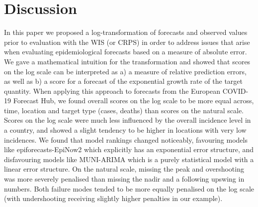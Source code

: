 \documentclass{article}
\begin{document}
\section{Discussion}
\label{sec:discussion}

In this paper we proposed a log-transformation of forecasts and observed values prior to evaluation with the WIS (or CRPS) in order to address issues that arise when evaluating epidemiological forecasts based on a measure of absolute error. We gave a mathematical intuition for the transformation and showed that scores on the log scale can be interpreted as a) a measure of relative prediction errors, as well as b) a score for a forecast of the exponential growth rate of the target quantity. 
When applying this approach to forecasts from the European COVID-19 Forecast Hub, we found overall scores on the log scale to be more equal across, time, location and target type (cases, deaths) than scores on the natural scale. Scores on the log scale were much less influenced by the overall incidence level in a country, and showed a slight tendency to be higher in locations with very low incidences. We found that model rankings changed noticeably, favouring models like epiforecasts-EpiNow2 which explicitly has an exponential error structure, and disfavouring models like MUNI-ARIMA which is a purely statistical model with a linear error structure. On the natural scale, missing the peak and overshooting was more severely penalised than missing the nadir and a following upswing in numbers. Both failure modes tended to be more equally penalised on the log scale (with undershooting receiving slightly higher penalties in our example). 
\end{document}
